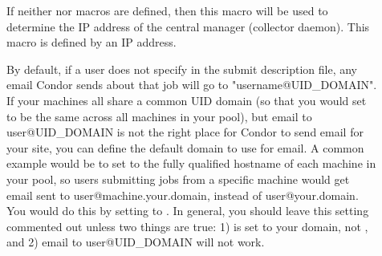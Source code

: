 \begin{description}
\item[] \label{param:CMIPAddr}
  If neither  nor 
   macros are defined, then this
  macro will be used to determine the IP address of the central
  manager (collector daemon).
  This macro is defined by an IP address.

\item[] \label{param:EmailDomain}
  By default, if a user does not specify  in the
  submit description file, any email Condor sends about that job will
  go to "username@UID\_DOMAIN".
  If your machines all share a common UID domain (so that you would
  set  to be the same across all machines in your
  pool), but email to user@UID\_DOMAIN is not the right place for
  Condor to send email for your site, you can define the default
  domain to use for email.
  A common example would be to set  to the fully
  qualified hostname of each machine in your pool, so users submitting
  jobs from a specific machine would get email sent to
  user@machine.your.domain, instead of user@your.domain.  
  You would do this by setting  to
  . 
  In general, you should leave this setting commented out unless two
  things are true: 1)  is set to your domain, not
  , and 2) email to user@UID\_DOMAIN will not 
  work. 
  

\end{description}
